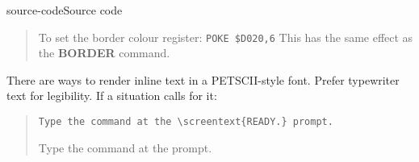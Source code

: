 \begin{sgentry}{source-code}{Source code}
\begin{quote}
        \hrulefill

        To set the border colour register: \texttt{POKE \$D020,6} This has the same effect as the \textbf{BORDER} command.
    \end{quote}

    There are ways to render inline text in a PETSCII-style font. Prefer typewriter text for legibility. If a situation calls for it:

    \begin{quote}
        \texttt{Type the command at the {\textbackslash}screentext\{READY.\} prompt.}

        \hrulefill

        Type the command at the  prompt.
    \end{quote}
\end{sgentry}

